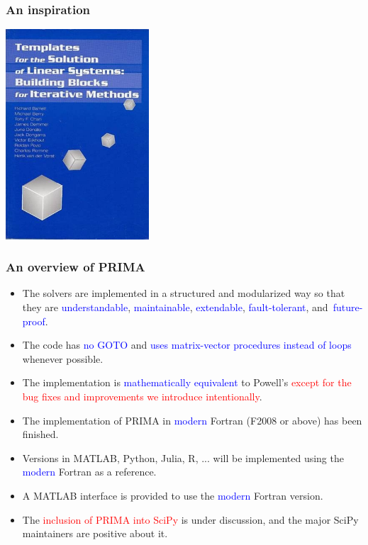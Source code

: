 \documentclass[slidestop,mathserif,xcolor=dvipsnames]{beamer}
\newcommand{\blue}[1]{\textcolor{blue}{#1}}
\newcommand{\red}[1]{\textcolor{red}{#1}}
\begin{document}
\begin{frame}
    \frametitle{An inspiration}

    \begin{center}
        \includegraphics[width=0.4\textwidth]{linalg.jpg}
    \end{center}

\end{frame}



\begin{frame}
    \frametitle{An overview of PRIMA}
\begin{itemize}
    \item The solvers are implemented in a structured and modularized way so that they are
        \blue{understandable}, \blue{maintainable},
        \blue{extendable},  \blue{fault-tolerant}, and~\mbox{\blue{future-proof}}.
    \vspace{1ex}
\item The code has \blue{no GOTO} and \blue{uses matrix-vector procedures instead of loops} whenever possible.
    \vspace{1ex}
\item The implementation is \blue{mathematically equivalent} to Powell's \red{except for the bug
    fixes and improvements we introduce intentionally}.
    \vspace{1ex}
\item The implementation of PRIMA in \blue{modern} Fortran (F2008 or above) has been finished.
    \vspace{1ex}
\item Versions in MATLAB, Python, Julia, R, ... will be implemented using the \blue{modern} Fortran as a reference.
    \vspace{1ex}
\item A MATLAB interface is provided to use the \blue{modern} Fortran version.
    \vspace{1ex}
\item The \red{inclusion of PRIMA into SciPy} is under discussion, and the major SciPy maintainers are
    positive about it.
\end{itemize}
\end{frame}
\end{document}
